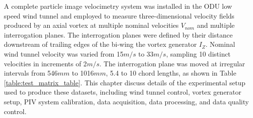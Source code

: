A complete particle image velocimetry system was installed in the ODU low speed 
wind tunnel and employed to measure three-dimensional velocity fields produced 
by an axial vortex at multiple nominal velocities $V_{nom}$ and multiple 
interrogation planes. The interrogation planes were defined by their 
distance downstream of trailing edges of the bi-wing the vortex generator 
$I_Z$. Nominal wind tunnel velocity was varied from 15$m/s$ to 33$m/s$, 
sampling 10 distinct velocities in increments of 2$m/s$. The interrogation 
plane was moved at irregular intervals from 546$mm$ to 1016$mm$, 5.4 to 10 
chord lengths, as shown in Table \ref{table:test_matrix_table}. This chapter 
discuss details of the experimental setup used to produce these datasets, 
including wind tunnel control, vortex generator setup, PIV system calibration, 
data acquisition, data processing, and data quality control.